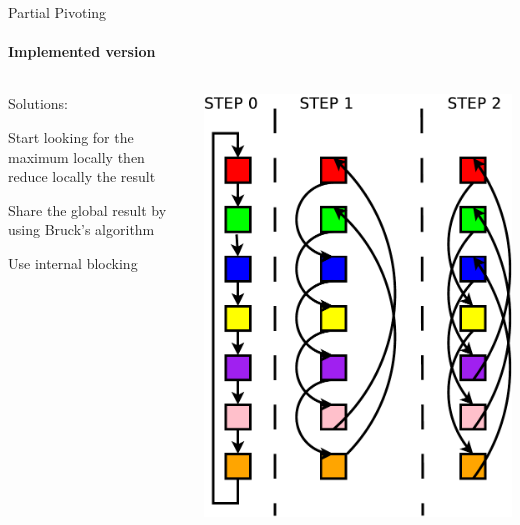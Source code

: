\begin{frame}{Partial Pivoting}
\framesubtitle{Implemented version}
\begin{columns}
\begin{column}{.60\textwidth}
Solutions:
\begin{itemize}
{
\item Start looking for the maximum locally then reduce locally the result
}
\item Share the global result by using Bruck's algorithm
\item Use internal blocking
\end{itemize}
\end{column}
\hfill
\begin{column}{.30\textwidth}
\begin{center}
\includegraphics[scale=0.3]{bruck.pdf}
\end{center}
\end{column}
\end{columns}
\end{frame}

